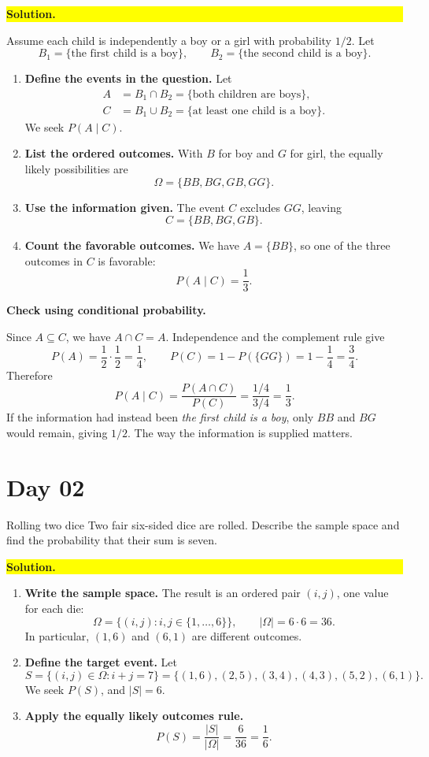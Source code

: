 \documentclass[a4paper,12pt,oneside]{report}
\newcommand{\exerciseheading}[1]{%
  \par\Needspace{5\baselineskip}\noindent\textbf{#1}\par\nobreak}
\newcommand{\solutionheading}[1]{%
  \par\Needspace{5\baselineskip}\noindent
  \begingroup\setlength{\fboxsep}{1pt}%
  \colorbox{yellow}{\strut\textbf{#1}}\endgroup\par\nobreak}
\begin{document}
\solutionheading{Solution.}
Assume each child is independently a boy or a girl with probability
$1/2$. Let
\[
  B_1=\{\text{the first child is a boy}\},\qquad
  B_2=\{\text{the second child is a boy}\}.
\]
\begin{enumerate}[label=\textbf{Step \arabic*:},leftmargin=*]
  \item \textbf{Define the events in the question.} Let
  \begin{align*}
    A&=B_1\cap B_2
       =\{\text{both children are boys}\},\\
    C&=B_1\cup B_2
       =\{\text{at least one child is a boy}\}.
  \end{align*}
  We seek $P(A\mid C)$.
  \item \textbf{List the ordered outcomes.} With $B$ for boy and $G$
  for girl, the equally likely possibilities are
  \[
    \Omega=\{BB,BG,GB,GG\}.
  \]
  \item \textbf{Use the information given.} The event $C$ excludes
  $GG$, leaving
  \[
    C=\{BB,BG,GB\}.
  \]
  \item \textbf{Count the favorable outcomes.} We have $A=\{BB\}$,
  so one of the three outcomes in $C$ is favorable:
  \[
    \boxed{P(A\mid C)=\frac13.}
  \]
\end{enumerate}

\exerciseheading{Check using conditional probability.}
Since $A\subseteq C$, we have $A\cap C=A$. Independence and the
complement rule give
\[
  P(A)=\frac12\cdot\frac12=\frac14,
  \qquad
  P(C)=1-P(\{GG\})=1-\frac14=\frac34.
\]
Therefore
\[
  P(A\mid C)=\frac{P(A\cap C)}{P(C)}
             =\frac{1/4}{3/4}=\frac13.
\]
If the information had instead been \emph{the first child is a boy},
only $BB$ and $BG$ would remain, giving $1/2$. The way the information
is supplied matters.

\clearpage
\section{Day 02}

\begin{framedexercise}{Rolling two dice}
Two fair six-sided dice are rolled. Describe the sample space and
find the probability that their sum is seven.
\end{framedexercise}

\solutionheading{Solution.}
\begin{enumerate}[label=\textbf{Step \arabic*:},leftmargin=*]
  \item \textbf{Write the sample space.} The result is an ordered pair
  $(i,j)$, one value for each die:
  \[
    \Omega=\{(i,j):i,j\in\{1,\ldots,6\}\},
    \qquad |\Omega|=6\cdot6=36.
  \]
  In particular, $(1,6)$ and $(6,1)$ are different outcomes.
  \item \textbf{Define the target event.} Let
  \[
    S=\{(i,j)\in\Omega:i+j=7\}
     =\{(1,6),(2,5),(3,4),(4,3),(5,2),(6,1)\}.
  \]
  We seek $P(S)$, and $|S|=6$.
  \item \textbf{Apply the equally likely outcomes rule.}
  \[
    \boxed{P(S)=\frac{|S|}{|\Omega|}=\frac{6}{36}=\frac16.}
  \]
\end{enumerate}
\end{document}
